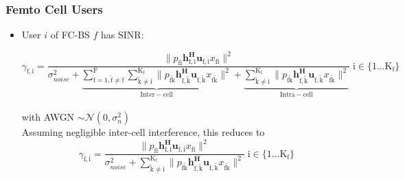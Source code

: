 \documentclass[12pt]{article}
\begin{document}
\subsubsection{Femto Cell Users}
\begin{itemize}



\item User $i$ of FC-BS $f$ has SINR:

	\begin{equation*}
	\gamma_{\mathrm{f,i}} = 
	\frac{\|p_{\mathrm{fi}}\mathbf{h^H_{\mathrm{f,i}}u_{\mathrm{f,i}}}x_{\mathrm{fi}}\|^2}
	{\sigma^2_{noise}   +
	\underbrace{
	\sum_{\mathrm{\tilde{f}=1,\tilde{f} \neq f}}^{\mathrm{F}}
	\sum_{\mathrm{\tilde{k}\neq i}}^{\mathrm{K_f}}
	  \|p_{\mathrm{f\tilde{k}}}\mathbf{h^H_{\mathrm{f,\tilde{k}}}u_{\mathrm{f,\tilde{k}}}}x_{\mathrm{f\tilde{k}}}\|^2}_
	  {\mathrm{Inter-cell}}+ \underbrace{
	\sum_{\mathrm{\tilde{k}\neq i}}^{\mathrm{K_f}}
	  \|p_{\mathrm{f\tilde{k}}}\mathbf{h^H_{\mathrm{f,\tilde{k}}}u_{\mathrm{f,\tilde{k}}}}x_{\mathrm{f\tilde{k}}}\|^2}
	 _{\mathrm{Intra-cell}}}
	  \; \mathrm{i \in \{1 ... K_f\}}\end{equation*}
\\
with AWGN $\sim \mathcal{N}(0,\sigma^2_n)$
\\

Assuming negligible inter-cell interference, this reduces to
	\begin{equation*}
	\gamma_{\mathrm{f,i}} = \frac{\|p_{\mathrm{fi}}\mathbf{h^H_{\mathrm{f,i}}
	u_{\mathrm{f,i}}}x_{\mathrm{fi}}\|^2}
	{\sigma^2_{noise} 
	 + \sum_{\mathrm{\tilde{k}\neq i}}^{\mathrm{K_f}}
	  \|p_{\mathrm{f\tilde{k}}}\mathbf{h^H_{\mathrm{f,\tilde{k}}}u_{\mathrm{f,\tilde{k}}}}x_{\mathrm{f\tilde{k}}}\|^2}
	  \; \mathrm{i \in \{1 ... K_f\}}
	\end{equation*}
\\

%

\end{itemize}
\end{document}
